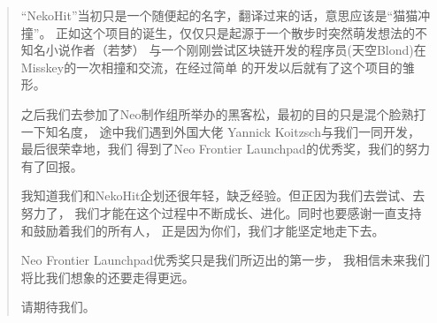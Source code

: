 \documentclass[11pt,UTF8,a4paper]{ctexart}
\begin{document}
    \begin{quotation}
        “NekoHit”当初只是一个随便起的名字，翻译过来的话，意思应该是“猫猫冲撞”。
        正如这个项目的诞生，仅仅只是起源于一个散步时突然萌发想法的不知名小说作者（若梦）
        与一个刚刚尝试区块链开发的程序员(天空Blond)在Misskey的一次相撞和交流，在经过简单
        的开发以后就有了这个项目的雏形。

        之后我们去参加了Neo制作组所举办的黑客松，最初的目的只是混个脸熟打一下知名度，
        途中我们遇到外国大佬 Yannick Koitzsch与我们一同开发，最后很荣幸地，我们
        得到了Neo Frontier Launchpad的优秀奖，我们的努力有了回报。

        我知道我们和NekoHit企划还很年轻，缺乏经验。但正因为我们去尝试、去努力了，
        我们才能在这个过程中不断成长、进化。同时也要感谢一直支持和鼓励着我们的所有人，
        正是因为你们，我们才能坚定地走下去。

        Neo Frontier Launchpad优秀奖只是我们所迈出的第一步，
        我相信未来我们将比我们想象的还要走得更远。

        请期待我们。

    \end{quotation}

    \clearpage

    
    
\end{document}
